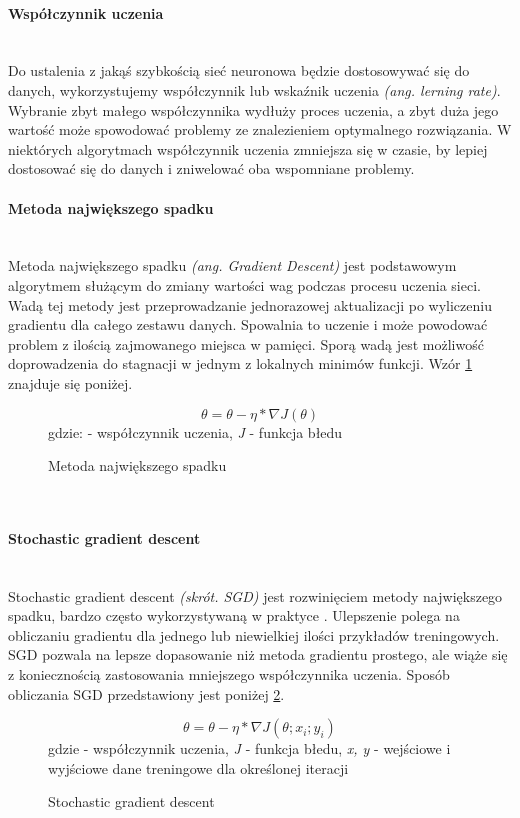 \paragraph{Współczynnik uczenia} \mbox{}\\
Do ustalenia z jakąś szybkością sieć neuronowa będzie dostosowywać się do danych, wykorzystujemy
współczynnik lub wskaźnik uczenia \textit{(ang. lerning rate)}. Wybranie zbyt małego
współczynnika wydłuży proces uczenia, a zbyt duża jego wartość może spowodować problemy
ze znalezieniem optymalnego rozwiązania. W niektórych algorytmach współczynnik uczenia
zmniejsza się w czasie, by lepiej dostosować się do danych i zniwelować oba wspomniane problemy.

\paragraph{Metoda największego spadku} \mbox{}\\
Metoda największego spadku \textit{(ang. Gradient Descent)} jest podstawowym algorytmem
służącym do zmiany wartości wag podczas procesu uczenia sieci.
Wadą tej metody jest przeprowadzanie jednorazowej aktualizacji po wyliczeniu gradientu dla
całego zestawu danych. Spowalnia to uczenie i może powodować problem z ilością zajmowanego
miejsca w pamięci. Sporą wadą jest możliwość doprowadzenia do stagnacji w jednym z
lokalnych minimów funkcji. Wzór \ref{eq:gradientdescent} znajduje się poniżej.
\begin{figure}[h!]
\renewcommand{\figurename}{Wzór}%
\begin{equation*}
\theta = \theta - \eta * \nabla J(\theta)
\end{equation*}
\centering
gdzie: \texteta - współczynnik uczenia, \textit{J} - funkcja błedu
\caption{Metoda największego spadku}
\label{eq:gradientdescent}
\end{figure}\\

\paragraph{Stochastic gradient descent} \mbox{}\\
Stochastic gradient descent \textit{(skrót. SGD)} jest rozwinięciem metody największego spadku,
bardzo często wykorzystywaną w praktyce \cite{OptimizersOverview}.
Ulepszenie polega na obliczaniu gradientu dla jednego lub niewielkiej ilości przykładów
treningowych. SGD pozwala na lepsze dopasowanie
niż metoda gradientu prostego, ale wiąże się z koniecznością zastosowania mniejszego
współczynnika uczenia. Sposób obliczania SGD przedstawiony jest poniżej \ref{eq:sgd}.
\begin{figure}[h!]
\renewcommand{\figurename}{Wzór}%
\begin{equation*}
\theta = \theta - \eta * \nabla J(\theta; x_i; y_i)
\end{equation*}
\centering
gdzie \texteta - współczynnik uczenia, \textit{J} - funkcja błedu,
\textit{x, y} - wejściowe i wyjściowe dane treningowe dla określonej iteracji
\caption{Stochastic gradient descent}
\label{eq:sgd}
\end{figure}

